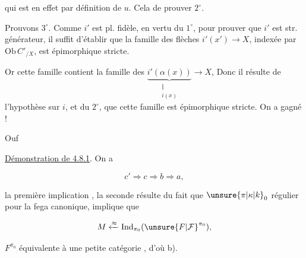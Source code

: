 qui est en effet  par définition de $u$. Cela  de prouver $2^\circ$.

Prouvons $3^\circ$. Comme $i'$ est pl. fidèle, en vertu du $1^\circ$, pour prouver que $i'$ est str. générateur, il suffit d'établir que  la famille des flèches $i'(x')\longrightarrow X$, indexée par $\mathrm{Ob}\,C'_{/X}$, est épimorphique stricte.

Or cette famille contient la famille des $\underbrace{i'(\alpha(x))}_{\substack{\Vert\\i(x)}}\longrightarrow X$,    Donc il résulte de l'hypothèse sur $i$, et du $2^\circ$, que cette famille est épimorphique stricte. On a gagné !

Ouf \par\hfill\unsure{$\backslash$}\hfill\null

\uline{Démonstration de 4.8.1}. On a

\[ c'\Longrightarrow c\Longrightarrow b\Longrightarrow a, \]

la première implication , la seconde résulte du fait que $\unsure{\pi|\kappa|k}_0$  régulier pour la fega canonique, implique que

\[ M\xleftarrow{\approx}\mathrm{Ind}_{\pi_0}(\unsure{F|\mathcal F}^{\pi_0}), \]

$F^{\pi_0}$ équivalente à une petite catégorie , d'où b). 
